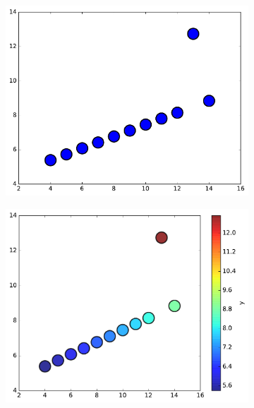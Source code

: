 \begin{figure}[H] %
\captionsetup[subfigure]{justification=centering}
\centering
\begin{subfigure}{.49\textwidth}
    \centering
    \includegraphics[width=\linewidth]{figures/scatter_2_bad.pdf}
\end{subfigure}
%
\begin{subfigure}{.49\textwidth}
    \centering
    \includegraphics[width=\linewidth]{figures/scatter_2_good.pdf}
\end{subfigure}
\end{figure}


